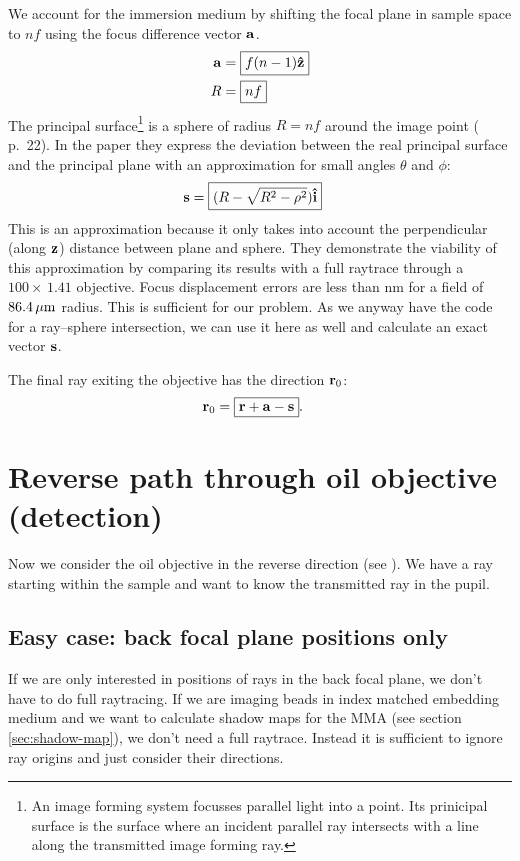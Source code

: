 We account for the immersion medium by shifting the focal plane in
sample space to $nf$ using the focus difference vector $\mathbf{a}$.
\begin{align}
  \mathbf{a} &= \boxed{f (n-1) \mathbf{\hat{z}}} \\
  R &= \boxed{nf}
\end{align}
The principal surface\footnote{An image forming system focusses
  parallel light into a point. Its prinicipal surface is the surface
  where an incident parallel ray intersects with a line along the
  transmitted image forming ray.} is a sphere of radius $R=nf$ around
the image point (\cite{Smith2000} p.~22). In the paper
\citep{Hwang2008} they express the deviation between the real
principal surface and the principal plane with an approximation for
small angles $\theta$ and $\phi$:
\begin{align}
  \mathbf{s} &= \boxed{(R - \sqrt{R^2-\rho^2})\mathbf{\hat{i}}}
\end{align}
This is an approximation because it only takes into account the
perpendicular (along $\mathbf{z}$) distance between plane and sphere. They
demonstrate the viability of this approximation by comparing its
results with a full raytrace through a $100\times\,1.41$
objective. Focus displacement errors are less than \unit[130]{nm} for
a field of $\unit[86.4]{\mu m}$ radius. This is sufficient for our
problem. As we anyway have the code for a ray--sphere intersection, we
can use it here as well and calculate an exact vector $\mathbf{s}$.

The final ray exiting the objective has the direction $\mathbf{r}_0$:
\begin{align}
  \mathbf{r}_0 &= \boxed{\mathbf{r} + \mathbf{a} - \mathbf{s}}.
\end{align}
\section{Reverse path through oil objective (detection)}
Now we consider the oil objective in the reverse direction (see
). We have a ray starting within the sample
and want to know the transmitted ray in the pupil.

\subsection{Easy case: back focal plane positions only}
If we are only interested in positions of rays in the back focal
plane, we don't have to do full raytracing. If we are imaging beads in
index matched embedding medium and we want to calculate shadow maps
for the MMA (see section \ref{sec:shadow-map}), we don't need a full
raytrace. Instead it is sufficient to ignore ray origins and just
consider their directions.

